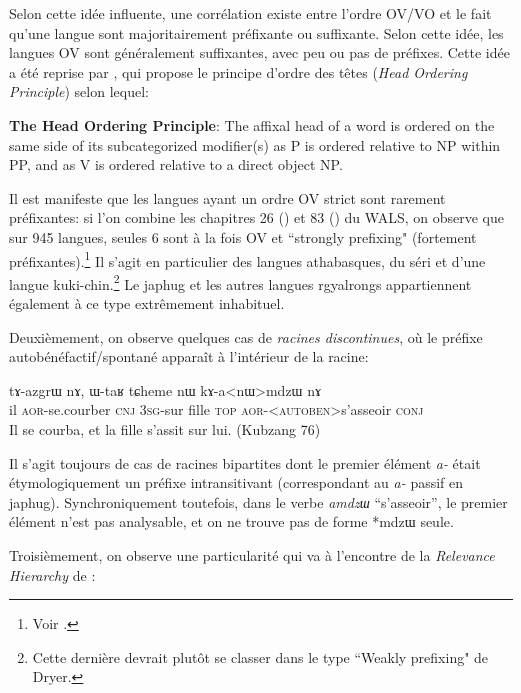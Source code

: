 \documentclass[oldfontcommands,twoside,a4paper,11pt,draft]{memoir}
\newcommand{\ipa}[1]{{\phon #1}} %
\newcommand{\aor}{\textsc{aor}}
\newcommand{\sg}{\textsc{sg}}
\newcommand{\topic}{\textsc{top}}
\begin{document}
 Selon cette idée influente, une corrélation existe entre l'ordre OV/VO et le fait qu'une langue sont majoritairement préfixante ou suffixante. Selon cette idée, les langues OV sont généralement suffixantes, avec peu ou pas de préfixes. Cette idée a été reprise par \citet[227]{hawkins88prefixing}, qui propose le principe d'ordre des têtes (\textit{Head Ordering Principle}) selon lequel:
 
\begin{exe}
\ex \label{ex:hawkins}
\glt \textbf{The Head Ordering Principle}: The affixal head of a word is ordered on the same side of its
subcategorized modifier(s) as P is ordered relative to NP within PP, and as V is ordered relative to a direct object NP.
\end{exe}

Il est manifeste que les langues ayant un ordre OV strict sont rarement préfixantes: si l'on combine les chapitres 26 (\citealt{dryer11chapter26}) et 83 (\citealt{dryer11ov}) du WALS, on observe que sur 945 langues, seules 6 sont à la fois OV et ``strongly prefixing" (fortement préfixantes).\footnote{Voir \citet{jacques13harmonization}.} Il s'agit en particulier des langues athabasques, du séri et d'une langue kuki-chin.\footnote{Cette dernière devrait plutôt se classer dans le type ``Weakly prefixing" de Dryer.} Le japhug et les autres langues rgyalrongs appartiennent également à ce type extrêmement inhabituel.

Deuxièmement, on observe quelques cas de \textit{racines discontinues}, où le préfixe autobénéfactif/spontané apparaît à l'intérieur de la racine:

\begin{exe}
\ex 
\gll \ipa{ɯʑo}	\ipa{tɤ-azgrɯ}	\ipa{nɤ},	\ipa{ɯ-taʁ}	\ipa{tɕheme}	\ipa{nɯ}	\ipa{kɤ-a<nɯ>mdzɯ}	\ipa{nɤ}\\
il \aor{}-se.courber \textsc{cnj} 3\sg{}-sur fille \topic{} \aor{}-<\textsc{autoben}>s'asseoir \textsc{conj} \\
\glt Il se courba, et la fille s'assit sur lui. (Kubzang 76)
\end{exe}

Il s'agit toujours de cas de racines bipartites dont le premier élément \textit{a-} était étymologiquement un préfixe intransitivant (correspondant au \textit{a-} passif en japhug). Synchroniquement toutefois, dans le verbe \textit{amdzɯ} ``s'asseoir'', le premier élément n'est pas analysable, et on ne trouve pas de forme *mdzɯ seule.
 
 
 Troisièmement, on observe une particularité  qui va à l'encontre de la \textit{Relevance Hierarchy} de  \citet{bybee85morpho}:
 
\end{document}
